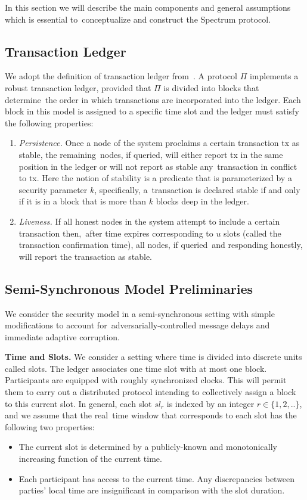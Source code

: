 In this section we will describe the main components and general assumptions which is essential to\
conceptualize and construct the Spectrum protocol.

\subsection{Transaction Ledger}\label{subsec:transaction-ledger.}
We adopt the definition of transaction ledger from~\cite{cryptoeprint:2016/889}.
A protocol $\Pi$ implements a robust transaction ledger, provided that $\Pi$ is divided into blocks that determine\
the order in which transactions are incorporated into the ledger.
Each block in this model is assigned to a specific time slot and the ledger must satisfy the following properties:
\begin{enumerate}
    \item \emph{Persistence.} Once a node of the system proclaims a certain transaction tx as stable, the remaining\
    nodes, if queried, will either report tx in the same position in the ledger or will not report as stable any\
    transaction in conflict to tx.
    Here the notion of stability is a predicate that is parameterized by a security parameter $k$, specifically, a\
    transaction is declared stable if and only if it is in a block that is more than $k$ blocks deep in the ledger.
    \item \emph{Liveness.} If all honest nodes in the system attempt to include a certain transaction then,\
    after time expires corresponding to $u$ slots (called the transaction confirmation time), all nodes, if queried\
    and responding honestly, will report the transaction as stable.
\end{enumerate}

\subsection{Semi-Synchronous Model Preliminaries}\label{subsec:the-semi-synchronous-model-preliminaries.}
We consider the security model in a semi-synchronous setting with simple modifications to account for\
adversarially-controlled message delays and immediate adaptive corruption.

\textbf{Time and Slots.}
We consider a setting where time is divided into discrete units called slots.
The ledger associates one time slot with at most one block.
Participants are equipped with roughly synchronized clocks.
This will permit them to carry out a distributed protocol intending to collectively assign a block to this current slot.
In general, each slot $sl_r$ is indexed by an integer $r \in \{1, 2, ..\}$, and we assume that the real\
time window that corresponds to each slot has the following two properties:
\begin{itemize}
    \item The current slot is determined by a publicly-known and monotonically increasing function of the current time.
    \item Each participant has access to the current time.
    Any discrepancies between parties' local time are insignificant in comparison with the slot duration.
\end{itemize}

